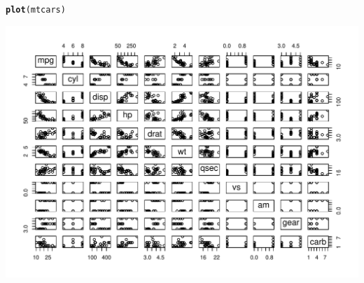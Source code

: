 \documentclass[11pt,letter]{article}\usepackage[]{graphicx}\usepackage[]{color}
\makeatletter
\def\maxwidth{ %
  \ifdim\Gin@nat@width>\linewidth
    \linewidth
  \else
    \Gin@nat@width
  \fi
}
\newcommand{\hlstd}[1]{\textcolor[rgb]{0.345,0.345,0.345}{#1}}%
\newcommand{\hlkwd}[1]{\textcolor[rgb]{0.737,0.353,0.396}{\textbf{#1}}}%
\newenvironment{kframe}{%
 \def\at@end@of@kframe{}%
 \ifinner\ifhmode%
  \def\at@end@of@kframe{\end{minipage}}%
  \begin{minipage}{\columnwidth}%
 \fi\fi%
 \def\FrameCommand##1{\hskip\@totalleftmargin \hskip-\fboxsep
 \colorbox{shadecolor}{##1}\hskip-\fboxsep
     \hskip-\linewidth \hskip-\@totalleftmargin \hskip\columnwidth}%
 \MakeFramed {\advance\hsize-\width
   \@totalleftmargin\z@ \linewidth\hsize
   \@setminipage}}%
 {\par\unskip\endMakeFramed%
 \at@end@of@kframe}
\newenvironment{knitrout}{}{} %
\makeatother
\begin{document}
\begin{knitrout}
\color{fgcolor}\begin{kframe}
\begin{alltt}
\hlkwd{plot}\hlstd{(mtcars)}
\end{alltt}
\end{kframe}

{\centering \includegraphics[width=\maxwidth]{figure/figure-1-1} 

}



\end{knitrout}







\newpage
\nocite{xtable,mag}



\newpage
\appendix
\end{document}
